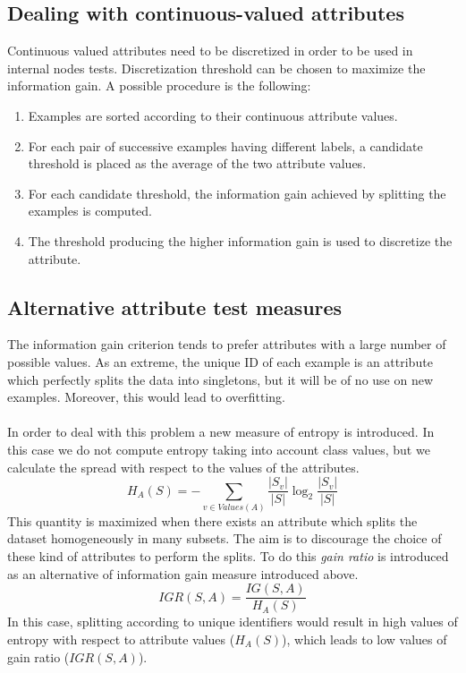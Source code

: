 \subsection{Dealing with continuous-valued attributes}
Continuous valued attributes need to be discretized in order to be used in internal
nodes tests. Discretization threshold can be chosen to maximize the information
gain. A possible procedure is the following:
\begin{enumerate}
	\item Examples are sorted according to their continuous attribute values.

	\item For each pair of successive examples having different labels, a
		candidate threshold is placed as the average of the two attribute values.

	\item For each candidate threshold, the information gain achieved by splitting
		the examples is computed.

	\item The threshold producing the higher information gain is used to discretize
		the attribute.
\end{enumerate}

\subsection{Alternative attribute test measures}
The information gain criterion tends to prefer attributes with a large number of
possible values. As an extreme, the unique ID of each example is an attribute which
perfectly splits the data into singletons, but it will be of no use on new
examples. Moreover, this would lead to overfitting.
\paragraph{}
In order to deal with this problem a new measure of entropy is introduced. In this
case we do not compute entropy taking into account class values, but we
calculate the spread with respect to the values of the attributes.
\begin{equation}
	H_{A}(S) = -\sum_{v \in \mathit{Values}(A)}\frac{|S_{v}|}{|S|}\log_{2}{\frac{|S_{v}|}{|S|}}
\end{equation}
This quantity is maximized when there exists an attribute which splits the dataset
homogeneously in many subsets. The aim is to discourage the choice of these kind
of attributes to perform the splits. To do this \textit{gain ratio} is
introduced as an alternative of information gain measure introduced above.
\begin{equation}
	\mathit{IGR}(S,A) = \frac{\mathit{IG}(S,A)}{H_{A}(S)}
\end{equation}
In this case, splitting according to unique identifiers would result in high
values of entropy with respect to attribute values ($H_{A}(S)$), which leads to low
values of gain ratio ($\mathit{IGR}(S,A)$).


